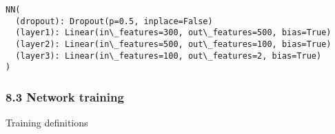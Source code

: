 \documentclass[10pt]{article}
\makeatletter
\newcommand{\boxspacing}{\kern\kvtcb@left@rule\kern\kvtcb@boxsep}
\newcommand{\prompt}[4]{
        \ttfamily\llap{{\color{#2}[#3]:\hspace{3pt}#4}}\vspace{-\baselineskip}
    }
\makeatother
\begin{document}
            \begin{tcolorbox}[breakable, size=fbox, boxrule=.5pt, pad at break*=1mm, opacityfill=0]
\prompt{Out}{outcolor}{59}{\boxspacing}
\begin{Verbatim}[commandchars=\\\{\}]
NN(
  (dropout): Dropout(p=0.5, inplace=False)
  (layer1): Linear(in\_features=300, out\_features=500, bias=True)
  (layer2): Linear(in\_features=500, out\_features=100, bias=True)
  (layer3): Linear(in\_features=100, out\_features=2, bias=True)
)
\end{Verbatim}
\end{tcolorbox}
        
    \hypertarget{network-training}{%
\subsubsection{8.3 Network training}\label{network-training}}

    Training definitions
\end{document}
